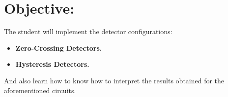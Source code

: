 \section{Objective:}

The student will implement the detector configurations: 

\begin{itemize}
\item {\bfseries Zero-Crossing Detectors.}
\item {\bfseries Hysteresis Detectors.} 
\end{itemize} 

And also learn how to know how to interpret the results obtained for the aforementioned circuits. 

\pagebreak